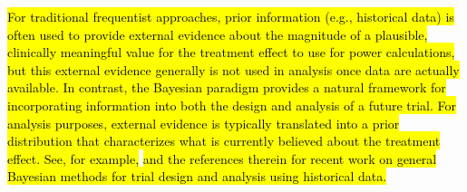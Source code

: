 \documentclass[12pt]{article}
\begin{document}
\hl{For traditional frequentist approaches, prior information (e.g., historical data) is often used to provide external evidence about the magnitude of a plausible, clinically meaningful 
value for the treatment effect to use for power calculations, but this external evidence generally is not used in analysis once data are actually available.
%
In contrast, the Bayesian paradigm provides a natural framework for incorporating information into both the design and analysis of a future trial.
%
For analysis purposes, external evidence is typically translated into a prior distribution that characterizes what is currently believed about the treatment effect.
%
See, for example,}\colorbox{yellow}{\cite{Psioda2018}}\hl{ and the references therein for recent work on general Bayesian methods for trial design and analysis using historical data.}
%
%
%


%
\end{document}
